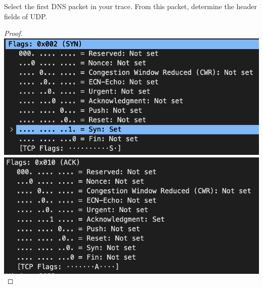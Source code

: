 \documentclass[../../main.tex]{subfiles}
\begin{document}
\begin{wts}
Select the first DNS packet in your trace. From this packet, determine the header fields of UDP.
\end{wts}
\begin{proof}
\includegraphics[width=\textwidth]{subfiles/images/ECSE_308_Lab_5_1_SUPA_PAGE1_1_Image28.png
}
\includegraphics[width=\textwidth]{subfiles/images/ECSE_308_Lab_5_1_SUPA_PAGE1_3_Image30.png}

\end{proof}
\end{document}
